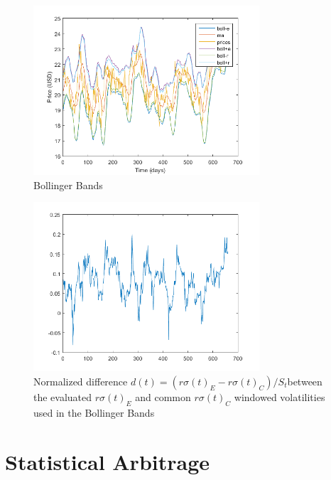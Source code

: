 \documentclass[11pt,a4,twosided,singlespacing,titlepagenumber=on]{scrreprt}
\numberwithin{equation}{chapter} %
\theoremstyle{remark}
\begin{document}
\begin{figure}[H]
\centering
\includegraphics[width = 0.75\textwidth]{model_vol/5}
\caption{Bollinger Bands}
\label{vol_mod_5}
\end{figure}

\begin{figure}[H]
\centering
\includegraphics[width = 0.75\textwidth]{model_vol/6}
\caption{Normalized difference $d(t) = (r\sigma(t)_E - r\sigma(t)_C) / S_t$between the evaluated $r\sigma(t)_E$ and common $r\sigma(t)_C$ windowed volatilities used in the Bollinger Bands}
\label{vol_mod_6}
\end{figure}

\chapter{Statistical Arbitrage}
\end{document}
